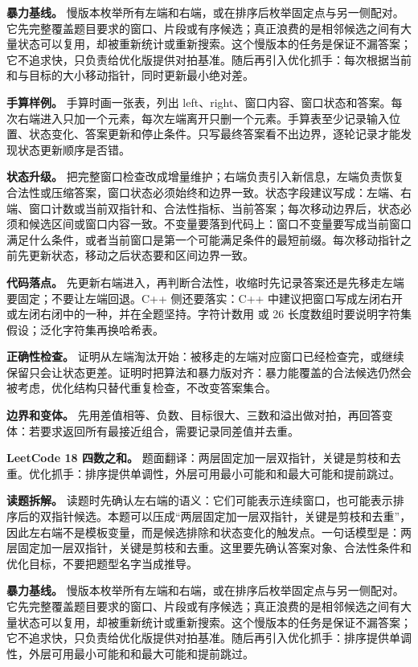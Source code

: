 \textbf{暴力基线。} 慢版本枚举所有左端和右端，或在排序后枚举固定点与另一侧配对。它先完整覆盖题目要求的窗口、片段或有序候选；真正浪费的是相邻候选之间有大量状态可以复用，却被重新统计或重新搜索。这个慢版本的任务是保证不漏答案；它不追求快，只负责给优化版提供对拍基准。随后再引入优化抓手：每次根据当前和与目标的大小移动指针，同时更新最小绝对差。

\textbf{手算样例。} 手算时画一张表，列出 left、right、窗口内容、窗口状态和答案。每次右端进入只加一个元素，每次左端离开只删一个元素。手算表至少记录输入位置、状态变化、答案更新和停止条件。只写最终答案看不出边界，逐轮记录才能发现状态更新顺序是否错。

\textbf{状态升级。} 把完整窗口检查改成增量维护；右端负责引入新信息，左端负责恢复合法性或压缩答案，窗口状态必须始终和边界一致。状态字段建议写成：左端、右端、窗口计数或当前双指针和、合法性指标、当前答案；每次移动边界后，状态必须和候选区间或窗口内容一致。不变量要落到代码上：窗口不变量要写成当前窗口满足什么条件，或者当前窗口是第一个可能满足条件的最短前缀。每次移动指针之前先更新状态，移动之后状态要和区间边界一致。

\textbf{代码落点。} 先更新右端进入，再判断合法性，收缩时先记录答案还是先移走左端要固定；不要让左端回退。C++ 侧还要落实：C++ 中建议把窗口写成左闭右开或左闭右闭中的一种，并在全题坚持。字符计数用  或 26 长度数组时要说明字符集假设；泛化字符集再换哈希表。

\textbf{正确性检查。} 证明从左端淘汰开始：被移走的左端对应窗口已经检查完，或继续保留只会让状态更差。证明时把算法和暴力版对齐：暴力能覆盖的合法候选仍然会被考虑，优化结构只替代重复检查，不改变答案集合。

\textbf{边界和变体。} 先用差值相等、负数、目标很大、三数和溢出做对拍，再回答变体：若要求返回所有最接近组合，需要记录同差值并去重。

\noindent\textbf{LeetCode 18 四数之和。} 题面翻译：两层固定加一层双指针，关键是剪枝和去重。优化抓手：排序提供单调性，外层可用最小可能和和最大可能和提前跳过。

\textbf{读题拆解。} 读题时先确认左右端的语义：它们可能表示连续窗口，也可能表示排序后的双指针候选。本题可以压成“两层固定加一层双指针，关键是剪枝和去重”，因此左右端不是模板变量，而是候选排除和状态变化的触发点。一句话模型是：两层固定加一层双指针，关键是剪枝和去重。这里要先确认答案对象、合法性条件和优化目标，不要把题型名字当成推导。

\textbf{暴力基线。} 慢版本枚举所有左端和右端，或在排序后枚举固定点与另一侧配对。它先完整覆盖题目要求的窗口、片段或有序候选；真正浪费的是相邻候选之间有大量状态可以复用，却被重新统计或重新搜索。这个慢版本的任务是保证不漏答案；它不追求快，只负责给优化版提供对拍基准。随后再引入优化抓手：排序提供单调性，外层可用最小可能和和最大可能和提前跳过。

